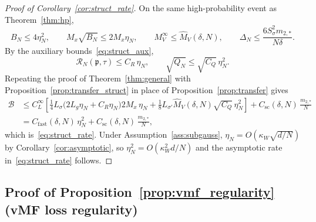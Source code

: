 \documentclass[11pt]{article}
\newcommand{\cB}{\mathcal{B}}
\newcommand{\nperm}{\mathfrak{p}}  %
\begin{document}
\begin{proof}[Proof of Corollary~\ref{cor:struct_rate}]
On the same high-probability event as Theorem~\ref{thm:hp},
\[
  B_N \le 4\eta_N^2,
  \qquad
  M_x\sqrt{B_N} \le 2M_x\eta_N,
  \qquad
  M_V^\infty \le \hat M_V(\delta,N),
  \qquad
  \Delta_N \le \frac{6S_\sigma^2 m_{2,*}}{N\delta}.
\]
By the auxiliary bounds~\eqref{eq:struct_aux},
\[
  \mathcal R_N(\nperm,\tau) \le C_R\,\eta_N,
  \qquad
  \sqrt{Q_N} \le \sqrt{C_Q}\,\eta_N^2.
\]
Repeating the proof of Theorem~\ref{thm:general} with
Proposition~\ref{prop:transfer_struct} in place of
Proposition~\ref{prop:transfer} gives
\begin{align*}
  \cB
  &\le
  C_L^\infty \!\left[
    \tfrac{1}{4}L_\sigma
    \bigl(2L_g\eta_N + C_R\eta_N\bigr)
    2M_x\,\eta_N
    + \tfrac{1}{8}L_{\sigma'} \hat M_V(\delta,N)\sqrt{C_Q}\,\eta_N^2
  \right]
  + C_{\mathrm{sc}}(\delta,N)\,\frac{m_{2,*}}{N} \\
  &=
  C_{\mathrm{fast}}(\delta,N)\,\eta_N^2
  + C_{\mathrm{sc}}(\delta,N)\,\frac{m_{2,*}}{N},
\end{align*}
which is~\eqref{eq:struct_rate}.
Under Assumption~\ref{ass:subgauss},
$\eta_N = O(\kappa_W\sqrt{d/N})$
by Corollary~\ref{cor:asymptotic}, so
$\eta_N^2 = O(\kappa_W^2 d/N)$ and
the asymptotic rate in~\eqref{eq:struct_rate} follows.
\end{proof}

\subsection{Proof of Proposition~\ref{prop:vmf_regularity}
  (vMF loss regularity)}\label{app:vmf_proof}
\end{document}
